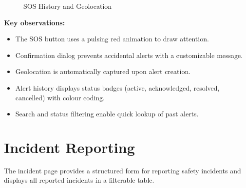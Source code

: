 \begin{figure}[H]
  \centering
  \begin{minipage}{0.45\textwidth}
    \centering
  \end{minipage}
  \hfill
  \begin{minipage}{0.45\textwidth}
    \centering
  \end{minipage}
  \caption{SOS History and Geolocation}
  \label{fig:screenshot-sos-history}
\end{figure}

\textbf{Key observations:}
\begin{itemize}
  \item The SOS button uses a pulsing red animation to draw attention.
  \item Confirmation dialog prevents accidental alerts with a customizable message.
  \item Geolocation is automatically captured upon alert creation.
  \item Alert history displays status badges (active, acknowledged, resolved, cancelled) with colour coding.
  \item Search and status filtering enable quick lookup of past alerts.
\end{itemize}

\section{Incident Reporting}

The incident page provides a structured form for reporting safety incidents and displays all reported incidents in a filterable table.

